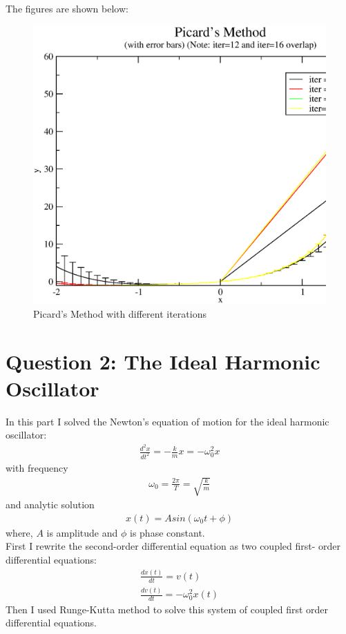 \documentclass[11pt,a4paper,english]{article}
\newcommand{\beqa}{\begin{eqnarray}}
\newcommand{\eeqa}{\end{eqnarray}}
\begin{document}
		    The figures are shown below:\\
	\begin{figure}[h!]
	\centering
	\includegraphics [scale=0.6]{figures/hw11qn1d.eps}
	\caption{Picard's Method with different iterations }
	\end{figure}
	\clearpage
		
\section{Question 2: The Ideal Harmonic Oscillator  }

	In this part I solved the Newton's equation of motion for the ideal harmonic
	oscillator:
	\beqa 
	\frac{d^{2}x}{dt^{2}} = -\frac{k}{m} x = - \omega_{0}^{2} x
	\eeqa
	with frequency
	\beqa 
	\omega_{0} = \frac{2\pi}{T} = \sqrt{\frac{k}{m}}
	\eeqa
	and analytic solution
	\beqa 
	x(t) = A sin(\omega_{0}t + \phi)
	\eeqa
	where, $A$ is amplitude and $\phi$ is phase constant.\\
	First I rewrite the second-order differential equation as two coupled first-
	order differential equations:
	\beqa 
	\frac{dx(t)}{dt} = v(t) \\
	\frac{dv(t)}{dt} = -\omega_{0}^{2}x(t) 
	\eeqa
	Then I used Runge-Kutta method to solve this system of coupled first order 
	differential equations.\\	
		
\end{document}
